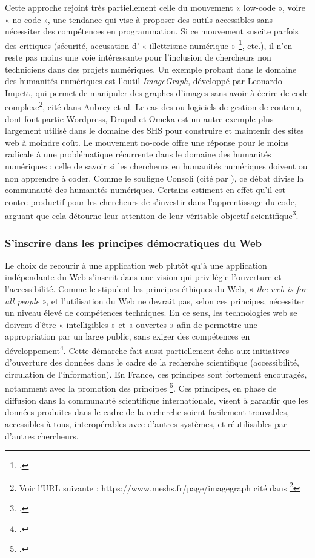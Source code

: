 Cette approche rejoint très partiellement celle du mouvement « low-code », voire « no-code », une tendance qui vise à proposer des outils accessibles sans nécessiter des compétences en programmation. Si ce mouvement suscite parfois des critiques (sécurité, accusation d’ « illettrisme numérique » \footcite[p.3]{cahier_comment_2022}, etc.), il n’en reste pas moins une voie intéressante pour l’inclusion de chercheurs non techniciens dans des projets numériques. Un exemple probant dans le domaine des humanités numériques est l’outil \textit{ImageGraph}, développé par Leonardo Impett, qui permet de manipuler des graphes d’images sans avoir à écrire de code complexe\footnote{Voir l’URL suivante : https://www.meshs.fr/page/imagegraph cité dans \footcite{aubry_artificial_2021}}, cité dans Aubrey et al. Le cas des \cms ou logiciels de gestion de contenu, dont font partie Wordpress, Drupal et Omeka est un autre exemple plus largement utilisé dans le domaine des SHS pour construire et maintenir des sites web à moindre coût.
Le mouvement no-code offre une réponse pour le moins radicale à une problématique récurrente dans le domaine des humanités numériques : celle de savoir si les chercheurs en humanités numériques doivent ou non apprendre à coder. Comme le souligne Consoli (cité par \citeauthor{anderson_teaching_nodate}), ce débat divise la communauté des humanités numériques. Certains estiment en effet qu’il est contre-productif pour les chercheurs de s’investir dans l'apprentissage du code, arguant que cela détourne leur attention de leur véritable objectif scientifique\footcite{anderson_teaching_nodate}.

\subsubsection{S’inscrire dans les principes démocratiques du Web}

Le choix de recourir à une application web plutôt qu’à une application indépendante du Web s’inscrit dans une vision qui privilégie l’ouverture et l’accessibilité. Comme le stipulent les principes éthiques du Web, « \textit{the web is for all people} », et l’utilisation du Web ne devrait pas, selon ces principes, nécessiter un niveau élevé de compétences techniques. En ce sens, les technologies web se doivent d’être « intelligibles » et « ouvertes » afin de permettre une appropriation par un large public, sans exiger des compétences en développement\footcite{noauthor_ethical_nodate}. 
Cette démarche fait aussi partiellement écho aux initiatives d’ouverture des données dans le cadre de la recherche scientifique (accessibilité, circulation de l’information). En France, ces principes sont fortement encouragés, notamment avec la promotion des principes \fair \footcite{wilkinson_fair_2016}. Ces principes, en phase de diffusion dans la communauté scientifique internationale, visent à garantir que les données produites dans le cadre de la recherche soient facilement trouvables, accessibles à tous, interopérables avec d’autres systèmes, et réutilisables par d’autres chercheurs.

